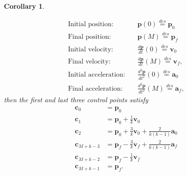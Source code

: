 \documentclass{article}
\newtheorem{corollary}[theorem]{Corollary}
\newcommand{\cbf}{\mathbf{c}}
\begin{document}
\begin{corollary}
\begin{description}
		\begin{align*}
			\text{Initial position:} &\quad \mathbf{p}(0) \stackrel{des}{=} \mathbf{p}_0 \\	
			\text{Final position:} &\quad \mathbf{p}(M) \stackrel{des}{=} \mathbf{p}_f \\
			\text{Initial velocity:} &\quad \frac{d\mathbf{p}}{dt}(0) \stackrel{des}{=} \mathbf{v}_0 \\	
			\text{Final velocity:} &\quad \frac{d\mathbf{p}}{dt}(M) \stackrel{des}{=} \mathbf{v}_f, \\
			\text{Initial acceleration:} &\quad \frac{d^2\mathbf{p}}{dt^2}(0) \stackrel{des}{=} \mathbf{a}_0 \\	
			\text{Final acceleration:} &\quad \frac{d^2\mathbf{p}}{dt^2}(M) \stackrel{des}{=} \mathbf{a}_f,
		\end{align*}
		then the first and last three control points satisfy
		\begin{align*}
			\cbf_0 &= \mathbf{p}_0 \\
			\cbf_1 &= \mathbf{p}_0 + \frac{1}{k} \mathbf{v}_0 \\
			\cbf_2 &= \mathbf{p}_0 + \frac{3}{k} \mathbf{v}_0 + \frac{2}{k(k-1)}\mathbf{a}_0 \\
			\cbf_{M+k-3} &= \mathbf{p}_f - \frac{3}{k}\mathbf{v}_f + \frac{2}{k(k-1)}\mathbf{a}_f \\
			\cbf_{M+k-2} &= \mathbf{p}_f - \frac{1}{k}\mathbf{v}_f \\
			\cbf_{M+k-1} &= \mathbf{p}_f.
		\end{align*}
	\end{description}
\end{corollary}


\end{document}
